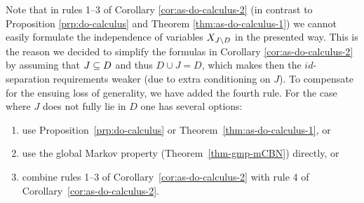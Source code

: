 \begin{Rem}
Note that in rules 1--3 of Corollary \ref{cor:as-do-calculus-2} (in contrast to Proposition \ref{prp:do-calculus} and Theorem \ref{thm:as-do-calculus-1})  we cannot easily formulate the independence of variables $X_{J \setminus D}$ in the presented way. 
 This is the reason we decided to simplify the formulas in Corollary \ref{cor:as-do-calculus-2} by assuming that $J \subseteq D$ and thus $D \cup J = D$, which makes then the $id$-separation requirements weaker (due to extra conditioning on $J$). 
 To compensate for the ensuing loss of generality, we have added the fourth rule.
For the case where $J$ does not fully lie in $D$ one has several options:
  \begin{enumerate}
    \item use Proposition~\ref{prp:do-calculus} or Theorem~\ref{thm:as-do-calculus-1}, or 
    \item use the global Markov property (Theorem~\ref{thm-gmp-mCBN}) directly, or
    \item combine rules 1--3 of Corollary~\ref{cor:as-do-calculus-2} with rule 4 of Corollary~\ref{cor:as-do-calculus-2}.
  \end{enumerate}
\end{Rem}
